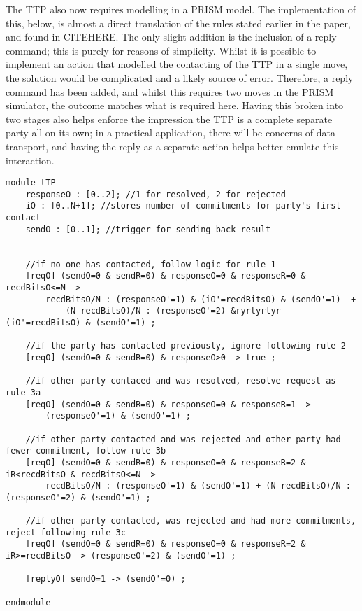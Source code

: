 \documentclass{l4proj}
\begin{document}
The TTP also now requires modelling in a PRISM model. The implementation of this, below, is almost a direct translation of the rules stated earlier in the paper, and found in CITEHERE. The only slight addition is the inclusion of a reply command; this is purely for reasons of simplicity. Whilst it is possible to implement an action that modelled the contacting of the TTP in a single move, the solution would be complicated and a likely source of error. Therefore, a reply command has been added, and whilst this requires two moves in the PRISM simulator, the outcome matches what is required here. Having this broken into two stages also helps enforce the impression the TTP is a complete separate party all on its own; in a practical application, there will be concerns of data transport, and having the reply as a separate action helps better emulate this interaction.
\begin{lstlisting}
module tTP
    responseO : [0..2]; //1 for resolved, 2 for rejected
    iO : [0..N+1]; //stores number of commitments for party's first contact
    sendO : [0..1]; //trigger for sending back result

        
    //if no one has contacted, follow logic for rule 1
    [reqO] (sendO=0 & sendR=0) & responseO=0 & responseR=0 & recdBitsO<=N -> 
        recdBitsO/N : (responseO'=1) & (iO'=recdBitsO) & (sendO'=1)  + 
            (N-recdBitsO)/N : (responseO'=2) &ryrtyrtyr (iO'=recdBitsO) & (sendO'=1) ;

    //if the party has contacted previously, ignore following rule 2
    [reqO] (sendO=0 & sendR=0) & responseO>0 -> true ;
    
    //if other party contaced and was resolved, resolve request as rule 3a
    [reqO] (sendO=0 & sendR=0) & responseO=0 & responseR=1 -> 
        (responseO'=1) & (sendO'=1) ;

	//if other party contacted and was rejected and other party had fewer commitment, follow rule 3b
    [reqO] (sendO=0 & sendR=0) & responseO=0 & responseR=2 & iR<recdBitsO & recdBitsO<=N -> 
        recdBitsO/N : (responseO'=1) & (sendO'=1) + (N-recdBitsO)/N : (responseO'=2) & (sendO'=1) ;

    //if other party contacted, was rejected and had more commitments, reject following rule 3c
	[reqO] (sendO=0 & sendR=0) & responseO=0 & responseR=2 & iR>=recdBitsO -> (responseO'=2) & (sendO'=1) ;

    [replyO] sendO=1 -> (sendO'=0) ;

endmodule

\end{lstlisting}
\end{document}
